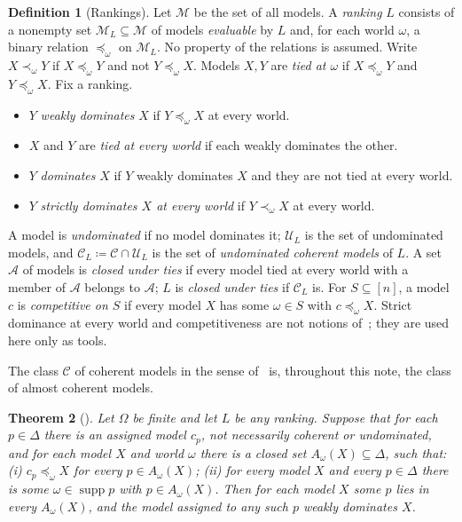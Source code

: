 \documentclass[11pt]{article}
\newtheorem{theorem}{Theorem}[section]
\theoremstyle{definition}
\newtheorem{definition}[theorem]{Definition}
\newcommand{\supp}{\operatorname{supp}}
\newcommand{\Cc}{\mathcal C}
\newcommand{\Mc}{\mathcal M}
\newcommand{\Uc}{\mathcal U}
\newcommand{\Ac}{\mathcal A}
\begin{document}
\begin{definition}[Rankings]\label{def:ranking}
Let $\Mc$ be the set of all models. A \emph{ranking} $L$ consists of a nonempty set $\Mc_L\subseteq\Mc$ of models \emph{evaluable} by $L$ and, for each world $\omega$, a binary relation $\preceq_\omega$ on $\Mc_L$. No property of the relations is assumed. Write $X\prec_\omega Y$ if $X\preceq_\omega Y$ and not $Y\preceq_\omega X$. Models $X,Y$ are \emph{tied at $\omega$} if $X\preceq_\omega Y$ and $Y\preceq_\omega X$. Fix a ranking.
\begin{itemize}[leftmargin=*]
\item $Y$ \emph{weakly dominates} $X$ if $Y\preceq_\omega X$ at every world.
\item $X$ and $Y$ are \emph{tied at every world} if each weakly dominates the other.
\item $Y$ \emph{dominates} $X$ if $Y$ weakly dominates $X$ and they are not tied at every world.
\item $Y$ \emph{strictly dominates $X$ at every world} if $Y\prec_\omega X$ at every world.
\end{itemize}
A model is \emph{undominated} if no model dominates it; $\Uc_L$ is the set of undominated models, and $\Cc_L\coloneqq\Cc\cap\Uc_L$ is the set of \emph{undominated coherent models} of $L$. A set $\Ac$ of models is \emph{closed under ties} if every model tied at every world with a member of $\Ac$ belongs to $\Ac$; $L$ is \emph{closed under ties} if $\Cc_L$ is. For $S\subseteq[n]$, a model $c$ is \emph{competitive on $S$} if every model $X$ has some $\omega\in S$ with $c\preceq_\omega X$. Strict dominance at every world and competitiveness are not notions of~\cite{LDG}; they are used here only as tools.
\end{definition}

The class $\Cc$ of coherent models in the sense of~\cite{LDG} is, throughout this note, the class of almost coherent models.

\begin{theorem}[{\cite[Theorem~2.2]{LDG}}]\label{thm:finite}
Let $\Omega$ be finite and let $L$ be any ranking. Suppose that for each $p\in\Delta$ there is an assigned model $c_p$, not necessarily coherent or undominated, and for each model $X$ and world $\omega$ there is a closed set $A_\omega(X)\subseteq\Delta$, such that: (i) $c_p\preceq_\omega X$ for every $p\in A_\omega(X)$; (ii) for every model $X$ and every $p\in\Delta$ there is some $\omega\in\supp p$ with $p\in A_\omega(X)$. Then for each model $X$ some $p$ lies in every $A_\omega(X)$, and the model assigned to any such $p$ weakly dominates $X$.
\end{theorem}
\end{document}
